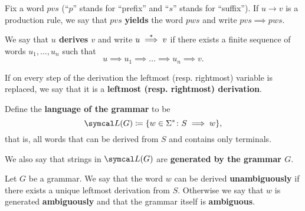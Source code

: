 \begin{definition}\label{def:grammar_derivation}\cite[104,108]{Sipser2013}
  Fix a word \( pvs \) (\enquote{\( p \)} stands for \enquote{prefix} and \enquote{\( s \)} stands for \enquote{suffix}). If \( u \to v \) is a production rule, we say that \( pvs \) \textbf{yields} the word \( pws \) and write \( pvs \implies pws \).

  We say that \textbf{\( u \) derives \( v \)} and write \( u \overset * \implies v \) if there exists a finite sequence of words \( u_1, \ldots, u_n \) such that
  \begin{equation*}
    u \implies u_1 \implies \ldots \implies u_n \implies v.
  \end{equation*}

  If on every step of the derivation the leftmost (resp. rightmost) variable is replaced, we say that it is a \textbf{leftmost (resp. rightmost) derivation}.

  Define the \textbf{language of the grammar} to be
  \begin{equation*}
    \Cal{L}(G) \coloneqq \{ w \in \Sigma^* \colon S \implies w \},
  \end{equation*}
  that is, all words that can be derived from \( S \) and contains only terminals.

  We also say that strings in \( \Cal{L}(G) \) are \textbf{generated by the grammar \( G \)}.
\end{definition}

\begin{definition}\label{def:ambiguous_grammar}\cite[definition 2.7]{Sipser2013}
  Let \( G \) be a grammar. We say that the word \( w \) can be derived \textbf{unambiguously} if there exists a unique leftmost derivation from \( S \). Otherwise we say that \( w \) is generated \textbf{ambiguously} and that the grammar itself is \textbf{ambiguous}.
\end{definition}

